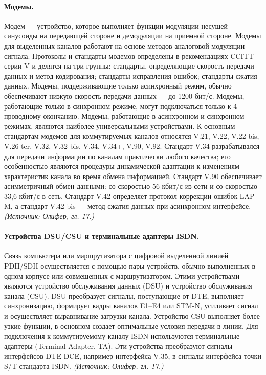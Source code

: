 \documentclass[a4paper,12pt]{article}
\begin{document}
\paragraph{Модемы.}
Модем — устройство, которое выполняет функции модуляции несущей синусоиды на передающей стороне и демодуляции на приемной стороне. Модемы для выделенных каналов работают на основе методов аналоговой модуляции сигнала. Протоколы и стандарты модемов определены в рекомендациях CCITT серии V и делятся на три группы: стандарты, определяющие скорость передачи данных и метод кодирования; стандарты исправления ошибок; стандарты сжатия данных. Модемы, поддерживающие только асинхронный режим, обычно обеспечивают низкую скорость передачи данных — до 1200 бит/с. Модемы, работающие только в синхронном режиме, могут подключаться только к 4-проводному окончанию. Модемы, работающие в асинхронном и синхронном режимах, являются наиболее универсальными устройствами. К основным стандартам модемов для коммутируемых каналов относятся V.21, V.22, V.22 bis, V.26 ter, V.32, V.32 bis, V.34, V.34+, V.90, V.92. Стандарт V.34 разрабатывался для передачи информации по каналам практически любого качества; его особенностью являются процедуры динамической адаптации к изменениям характеристик канала во время обмена информацией. Стандарт V.90 обеспечивает асимметричный обмен данными: со скоростью 56 кбит/с из сети и со скоростью 33,6 кбит/с в сеть. Стандарт V.42 определяет протокол коррекции ошибок LAP-M, а стандарт V.42 bis — метод сжатия данных при асинхронном интерфейсе.
\textit{(Источник: Олифер, гл. 17.)}

\paragraph{Устройства DSU/CSU и терминальные адаптеры ISDN.}
Связь компьютера или маршрутизатора с цифровой выделенной линией PDH/SDH осуществляется с помощью пары устройств, обычно выполненных в одном корпусе или совмещенных с маршрутизатором. Этими устройствами являются устройство обслуживания данных (DSU) и устройство обслуживания канала (CSU). DSU преобразует сигналы, поступающие от DTE, выполняет синхронизацию, формирует кадры каналов E1–E4 или STM-N, усиливает сигнал и осуществляет выравнивание загрузки канала. Устройство CSU выполняет более узкие функции, в основном создает оптимальные условия передачи в линии. Для подключения к коммутируемому каналу ISDN используются терминальные адаптеры (Terminal Adapter, TA). Эти устройства преобразуют сигналы интерфейсов DTE-DCE, например интерфейса V.35, в сигналы интерфейса точки S/T стандарта ISDN.
\textit{(Источник: Олифер, гл. 17.)}
\end{document}
